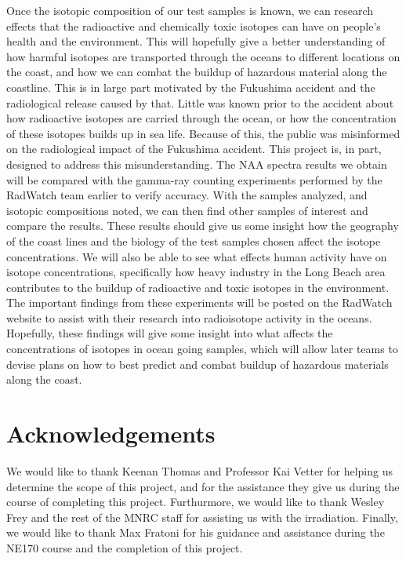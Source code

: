 \documentclass[]{article}
\begin{document}
Once the isotopic composition of our test samples is known, we can research effects that the radioactive and chemically toxic isotopes can have on people’s health and the environment. This will hopefully give a better understanding of how harmful isotopes are transported through the oceans to different locations on the coast, and how we can combat the buildup of hazardous material along the coastline. This is in large part motivated by the Fukushima accident and the radiological release caused by that. Little was known prior to the accident about how radioactive isotopes are carried through the ocean, or how the concentration of these isotopes builds up in sea life. Because of this, the public was misinformed on the radiological impact of the Fukushima accident. This project is, in part, designed to address this misunderstanding. The NAA spectra results we obtain will be compared with the gamma-ray counting experiments performed by the RadWatch team earlier to verify accuracy. With the samples analyzed, and isotopic compositions noted, we can then find other samples of interest and compare the results. These results should give us some insight how the geography of the coast lines and the biology of the test samples chosen affect the isotope concentrations. We will also be able to see what effects human activity have on isotope concentrations, specifically how heavy industry in the Long Beach area contributes to the buildup of radioactive and toxic isotopes in the environment. The important findings from these experiments will be posted on the RadWatch website to assist with their research into radioisotope activity in the oceans. Hopefully, these findings will give some insight into what affects the concentrations of isotopes in ocean going samples, which will allow later teams to devise plans on how to best predict and combat buildup of hazardous materials along the coast. 

\section{Acknowledgements}

We would like to thank Keenan Thomas and Professor Kai Vetter for helping us determine the scope of this project, and for the assistance they give us during the course of completing this project. Furthurmore, we would like to thank Wesley Frey and the rest of the MNRC staff for assisting us with the irradiation. Finally, we would like to thank Max Fratoni for his guidance and assistance during the NE170 course and the completion of this project.
\end{document}
